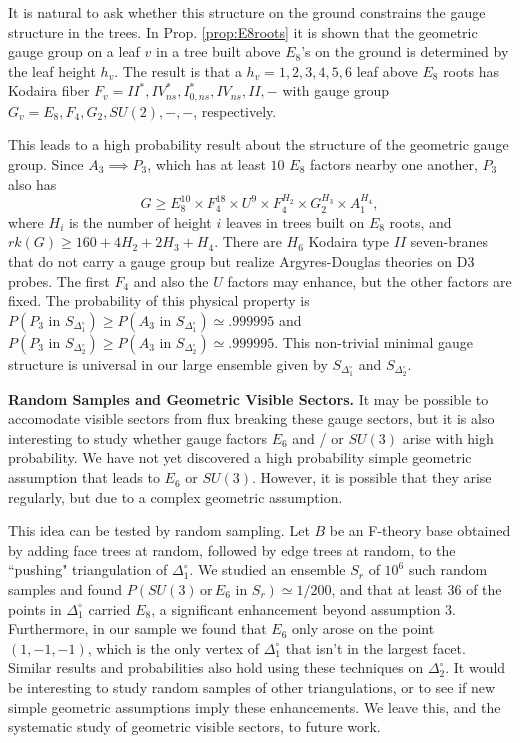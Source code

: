 \documentclass[aps,prl,twocolumn, superscriptaddress,groupedaddress,nofootinbib]{revtex4-1}
\newcommand{\sdoc}{S_{\Delta_1^\circ}}
\newcommand{\sdtc}{S_{\Delta_2^\circ}}
\newcommand{\doc}{{\Delta_1^\circ}}
\newcommand{\dtc}{{\Delta_2^\circ}}
\newcommand{\textin}{\,\, \text{in} \,\,}
\newcommand{\XXX}[3]{}
\begin{document}
It is natural to ask whether this structure on the ground constrains the gauge
structure in the trees. In Prop. \ref{prop:E8roots} it is shown that the 
geometric gauge group on a leaf $v$ in a tree built above $E_8$'s on the ground
is determined by the leaf height $h_v$. 
The result is that a $h_v=1,2,3,4,5,6$ leaf
above $E_8$ roots has Kodaira fiber $F_v=II^*,IV^*_{ns},I^*_{0,ns},IV_{ns},II,-$
with gauge group $G_v=E_8,F_4,G_2,SU(2),-,-$, respectively.

This leads to a high probability result about the structure of the geometric gauge group.
Since $A_3\implies P_3$, which has at least $10$ $E_8$ factors nearby one another, $P_3$
also has
\begin{equation}
G\geq E_8^{10} \times F_4^{18}\times U^9 \times F_4^{H_2}\times G_2^{H_3}\times A_1^{H_4},
\end{equation}
where $H_i$ is the number of height $i$ leaves in trees built on $E_8$ roots,
and $rk(G)\geq 160+4H_2+2H_3+H_4$.
There are $H_6$ Kodaira type $II$ seven-branes that do not carry a gauge group but realize
Argyres-Douglas theories on D3 probes. The first $F_4$ and also
the $U$ factors may enhance, but the other factors are fixed. The probability
of this physical property is $P(P_3\textin \sdoc)\geq P(A_3\textin \sdoc) \simeq .999995$ and $P(P_3\textin \sdtc)\geq P(A_3\textin \sdtc) \simeq .999995$. This non-trivial minimal gauge structure is universal in our large ensemble given by $\sdoc$ and $\sdtc$.



\vspace{.2cm}
\noindent \textbf{Random Samples and Geometric Visible Sectors.} 
It may be possible to accomodate visible sectors from flux breaking
these gauge sectors, but it is also interesting to study whether gauge
factors $E_6$ and / or $SU(3)$ arise with high probability.
We have not yet discovered a high probability simple geometric assumption
that leads to $E_6$ or $SU(3)$. However, it is possible that they arise regularly,
but due to a complex geometric assumption.

This idea can be tested by random sampling. Let $B$ be an F-theory base obtained
by adding face trees at random, followed by edge trees at random, to the ``pushing" 
triangulation of $\doc$. We studied an ensemble $S_r$ of $10^6$ such random samples 
and found $P(SU(3) \, \text{or} \, E_6 \textin S_r)\simeq 1/200$, and that at least 
$36$ of the points in $\doc$ carried $E_8$, a significant enhancement beyond
assumption $3$.  Furthermore, in our sample we found that $E_6$ only
arose on the point $(1,-1,-1)$, which is the only vertex of $\doc$
that isn't in the largest facet.  Similar results and probabilities also hold
using these techniques on $\dtc$. It would be interesting to study random samples of other triangulations, or to
see if new simple geometric assumptions imply these enhancements. We leave this,
and the systematic study of geometric visible sectors, to future work.
\end{document}
